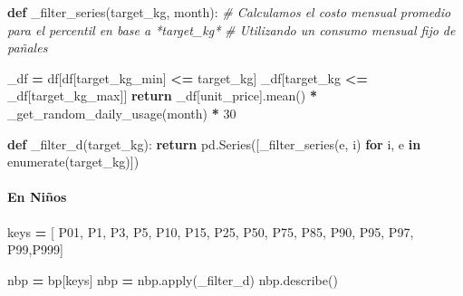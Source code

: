 \documentclass[
]{article}
\newenvironment{Shaded}{\begin{snugshade}}{\end{snugshade}}
\newcommand{\BuiltInTok}[1]{#1}
\newcommand{\CommentTok}[1]{\textcolor[rgb]{0.56,0.35,0.01}{\textit{#1}}}
\newcommand{\ControlFlowTok}[1]{\textcolor[rgb]{0.13,0.29,0.53}{\textbf{#1}}}
\newcommand{\DecValTok}[1]{\textcolor[rgb]{0.00,0.00,0.81}{#1}}
\newcommand{\KeywordTok}[1]{\textcolor[rgb]{0.13,0.29,0.53}{\textbf{#1}}}
\newcommand{\NormalTok}[1]{#1}
\newcommand{\OperatorTok}[1]{\textcolor[rgb]{0.81,0.36,0.00}{\textbf{#1}}}
\newcommand{\StringTok}[1]{\textcolor[rgb]{0.31,0.60,0.02}{#1}}
\begin{document}
\begin{Shaded}
\begin{Highlighting}[]
\KeywordTok{def}\NormalTok{ \_filter\_series(target\_kg, month):}
    \CommentTok{\# Calculamos el costo mensual promedio para el percentil en base a *target\_kg*}
    \CommentTok{\# Utilizando un consumo mensual fijo de pañales}

\NormalTok{    \_df }\OperatorTok{=}\NormalTok{ df[df[}\StringTok{\textquotesingle{}target\_kg\_min\textquotesingle{}}\NormalTok{] }\OperatorTok{\textless{}=}\NormalTok{ target\_kg]}
\NormalTok{    \_df[target\_kg }\OperatorTok{\textless{}=}\NormalTok{ \_df[}\StringTok{\textquotesingle{}target\_kg\_max\textquotesingle{}}\NormalTok{]]}
    \ControlFlowTok{return}\NormalTok{ \_df[}\StringTok{\textquotesingle{}unit\_price\textquotesingle{}}\NormalTok{].mean() }\OperatorTok{*}\NormalTok{ \_get\_random\_daily\_usage(month) }\OperatorTok{*} \DecValTok{30}

\KeywordTok{def}\NormalTok{ \_filter\_d(target\_kg):}
    \ControlFlowTok{return}\NormalTok{ pd.Series([\_filter\_series(e, i) }\ControlFlowTok{for}\NormalTok{ i, e }\KeywordTok{in} \BuiltInTok{enumerate}\NormalTok{(target\_kg)])}
\end{Highlighting}
\end{Shaded}

\hypertarget{en-niuxf1os}{%
\paragraph{En Niños}\label{en-niuxf1os}}

\begin{Shaded}
\begin{Highlighting}[]
\NormalTok{keys }\OperatorTok{=}\NormalTok{ [ }\StringTok{\textquotesingle{}P01\textquotesingle{}}\NormalTok{, }\StringTok{\textquotesingle{}P1\textquotesingle{}}\NormalTok{, }\StringTok{\textquotesingle{}P3\textquotesingle{}}\NormalTok{, }\StringTok{\textquotesingle{}P5\textquotesingle{}}\NormalTok{, }\StringTok{\textquotesingle{}P10\textquotesingle{}}\NormalTok{, }\StringTok{\textquotesingle{}P15\textquotesingle{}}\NormalTok{, }\StringTok{\textquotesingle{}P25\textquotesingle{}}\NormalTok{, }\StringTok{\textquotesingle{}P50\textquotesingle{}}\NormalTok{, }\StringTok{\textquotesingle{}P75\textquotesingle{}}\NormalTok{, }\StringTok{\textquotesingle{}P85\textquotesingle{}}\NormalTok{, }\StringTok{\textquotesingle{}P90\textquotesingle{}}\NormalTok{, }\StringTok{\textquotesingle{}P95\textquotesingle{}}\NormalTok{, }\StringTok{\textquotesingle{}P97\textquotesingle{}}\NormalTok{, }\StringTok{\textquotesingle{}P99\textquotesingle{}}\NormalTok{,}\StringTok{\textquotesingle{}P999\textquotesingle{}}\NormalTok{]}

\NormalTok{nbp }\OperatorTok{=}\NormalTok{ bp[keys]}
\NormalTok{nbp }\OperatorTok{=}\NormalTok{ nbp.}\BuiltInTok{apply}\NormalTok{(\_filter\_d)}
\NormalTok{nbp.describe()}
\end{Highlighting}
\end{Shaded}
\end{document}
